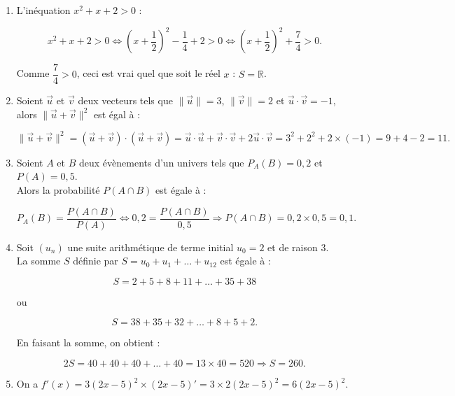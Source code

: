 \begin{enumerate}
		\item 	L'inéquation \(x^2 + x + 2 > 0\) :
		
		\[
		x^2 + x + 2 > 0 \iff \left( x + \dfrac{1}{2} \right)^2 - \dfrac{1}{4} + 2 > 0 \iff \left( x + \dfrac{1}{2} \right)^2 + \dfrac{7}{4} > 0.
		\]
		
		Comme \(\dfrac{7}{4} > 0\), ceci est vrai quel que soit le réel \(x\) : \(S = \mathbb{R}\).
		
		\item 
		
		Soient \(\overrightarrow{u}\) et \(\overrightarrow{v}\) deux vecteurs tels que \(\|\overrightarrow{u} \| = 3\), \(\|\overrightarrow{v} \| = 2\) et \(\overrightarrow{u} \cdot \overrightarrow{v} = -1\),\\
		alors \(\|\overrightarrow{u} + \overrightarrow{v} \|^2\) est égal à :
		
		\[
		\|\overrightarrow{u} + \overrightarrow{v} \|^2 = (\overrightarrow{u} + \overrightarrow{v}) \cdot (\overrightarrow{u} + \overrightarrow{v}) = \overrightarrow{u} \cdot \overrightarrow{u} + \overrightarrow{v} \cdot \overrightarrow{v} + 2 \overrightarrow{u} \cdot \overrightarrow{v} = 3^2 + 2^2 + 2 \times (-1) = 9 + 4 - 2 = 11.
		\]
		
		\item 
		
		Soient \(A\) et \(B\) deux évènements d'un univers tels que \(P_A(B) = 0,2\) et \(P(A) = 0,5\).\\ Alors la probabilité \(P(A \cap B)\) est égale à :
		
		\[
		P_A(B) = \dfrac{P(A \cap B)}{P(A)} \iff 0,2 = \dfrac{P(A \cap B)}{0,5} \Rightarrow P(A \cap B) = 0,2 \times 0,5 = 0,1.
		\]
		
		\item 
		
		Soit \((u_n)\) une suite arithmétique de terme initial \(u_0 = 2\) et de raison $3$.\\ 
		La somme \(S\) définie par \(S = u_0 + u_1 + \ldots + u_{12}\) est égale à :
		
		\[
		S = 2 + 5 + 8 + 11 + \ldots + 35 + 38
		\]
		
		ou
		
		\[
		S = 38 + 35 + 32 + \ldots + 8 + 5 + 2.
		\]
		
		En faisant la somme, on obtient :
		
		\[
		2S = 40 + 40 + 40 + \ldots + 40 = 13 \times 40 = 520 \Rightarrow S = 260.
		\]
		
		\item 
		
		On a \(f'(x) = 3(2x - 5)^2 \times (2x - 5)' = 3 \times 2(2x - 5)^2 = 6(2x - 5)^2\).
	\end{enumerate}
